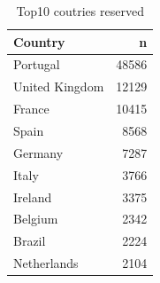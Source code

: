 \documentclass[11pt,a4paper,]{article}
\newenvironment{Shaded}{\begin{snugshade}}{\end{snugshade}}
\newcommand{\DataTypeTok}[1]{\textcolor[rgb]{0.13,0.29,0.53}{#1}}
\newcommand{\DecValTok}[1]{\textcolor[rgb]{0.00,0.00,0.81}{#1}}
\newcommand{\KeywordTok}[1]{\textcolor[rgb]{0.13,0.29,0.53}{\textbf{#1}}}
\newcommand{\NormalTok}[1]{#1}
\newcommand{\OperatorTok}[1]{\textcolor[rgb]{0.81,0.36,0.00}{\textbf{#1}}}
\newcommand{\StringTok}[1]{\textcolor[rgb]{0.31,0.60,0.02}{#1}}
\begin{document}
\begin{Shaded}
\end{Shaded}

\begin{table}

\caption{\label{tab:unnamed-chunk-15}Top10 coutries reserved}
\centering
\begin{tabular}[t]{l|r}
\hline
Country & n\\
\hline
Portugal & 48586\\
\hline
United Kingdom & 12129\\
\hline
France & 10415\\
\hline
Spain & 8568\\
\hline
Germany & 7287\\
\hline
Italy & 3766\\
\hline
Ireland & 3375\\
\hline
Belgium & 2342\\
\hline
Brazil & 2224\\
\hline
Netherlands & 2104\\
\hline
\end{tabular}
\end{table}
\end{document}
